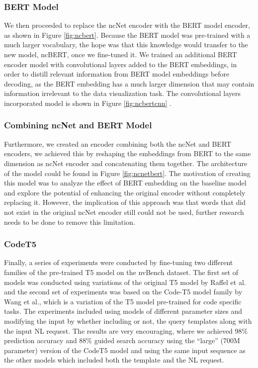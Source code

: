 \documentclass[
	a4paper, %
	10pt, %
	unnumberedsections, %
	twoside, %
]{t0003}
\begin{document}
\subsubsection{BERT Model}

We then proceeded to replace the ncNet encoder with the BERT model encoder, as shown in Figure \ref{fig:ncbert}. Because the BERT model was pre-trained with a much larger vocabulary, the hope was that this knowledge would transfer to the new model, ncBERT, once we fine-tuned it. We trained an additional BERT encoder model with convolutional layers added to the BERT embeddings, in order to distill relevant information from BERT model embeddings before decoding, as the BERT embedding has a much larger dimension that may contain information irrelevant to the data visualization task. The convolutional layers incorporated model is shown in Figure \ref{fig:ncbertcnn} .

\subsubsection{Combining ncNet and BERT Model}

Furthermore, we created an encoder combining both the ncNet and BERT encoders, we achieved this by reshaping the embeddings from BERT to the same dimension as ncNet encoder and concatenating them together. The architecture of the model could be found in Figure \ref{fig:ncnetbert}. The motivation of creating this model was to analyze the effect of BERT embedding on the baseline model and explore the potential of enhancing the original encoder without completely replacing it. However, the implication of this approach was that words that did not exist in the original ncNet encoder still could not be used, further research needs to be done to remove this limitation. 

\subsubsection{CodeT5}

Finally, a series of experiments were conducted by fine-tuning two different families of the pre-trained T5 model on the nvBench dataset. The first set of models was conducted using variations of the original T5 model \cite{Raffel:2020qr} by Raffel et al. and the second set of experiments was based on the Code-T5 model family \cite{Yue:2021qr2} by Wang et al., which is a variation of the T5 model pre-trained for code specific tasks. The experiments included using models of different parameter sizes and modifying the input by whether including or not, the query templates along with the input NL request. The results are very encouraging, where we achieved 98\% prediction accuracy and 88\% guided search accuracy using the “large” (700M parameter) version of the CodeT5 model and using the same input sequence as the other models which included both the template and the NL request.
\end{document}
